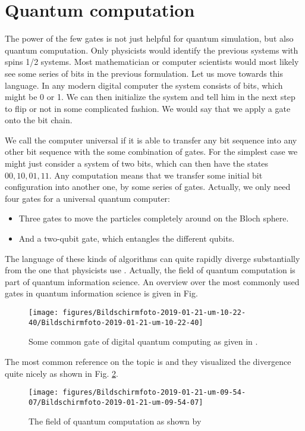 \documentclass[10pt]{article}
\let\cite\citep
\providecommand\citep{\cite}
\begin{document}
\section{Quantum computation}
The power of the few gates is not just helpful for quantum simulation, but also quantum computation.  Only physicists would identify the previous systems with spins 1/2 systems. Most mathematician or computer scientists would most likely see some series of bits in the previous formulation. Let us move towards this language. In any modern digital computer the system consists of bits, which might be 0 or 1. We can then initialize the system and tell him in the next step to flip or not in some complicated fashion. We would say that we apply a gate onto the bit chain. 

We call the computer universal if it is able to transfer any bit sequence into any other bit sequence with the some  combination of gates.  For the simplest case we might just consider a system of two bits, which can then have the states ${00, 10, 01, 11}$. Any computation means that we transfer some initial bit configuration into another one, by some series of gates. Actually, we only need four gates for a universal quantum computer:
\begin{itemize}
\item Three gates to move the particles completely around on the Bloch sphere.
\item And a two-qubit gate, which entangles the different qubits.
\end{itemize}

The language of these kinds of algorithms can quite rapidly diverge substantially from the one that physicists use . Actually, the field of quantum computation is part of quantum information science. An overview over the most commonly used gates in quantum information science is given in Fig.
\begin{figure}[h!]
\begin{center}
\texttt{[image: figures/Bildschirmfoto-2019-01-21-um-10-22-40/Bildschirmfoto-2019-01-21-um-10-22-40]}
\caption{{Some common gate of digital quantum computing as given in
\protect\cite{beginners}.
{\label{307961}}%
}}
\end{center}
\end{figure}

 The most common reference on the topic is \cite{Nielsen_2009} and they visualized the divergence quite nicely as shown in Fig. \ref{679777}.
\begin{figure}[h!]
\begin{center}
\texttt{[image: figures/Bildschirmfoto-2019-01-21-um-09-54-07/Bildschirmfoto-2019-01-21-um-09-54-07]}
\caption{{The field of quantum computation as shown by \protect\cite{Nielsen_2009}
{\label{679777}}%
}}
\end{center}
\end{figure}
\end{document}
